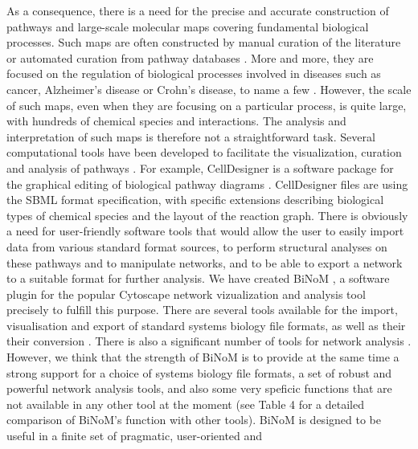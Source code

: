 \documentclass[10pt]{bmc_article}
\newenvironment{bmcformat}{\baselineskip20pt\sloppy\setboolean{publ}{false}}{\baselineskip20pt\sloppy}
\begin{document}
\begin{bmcformat}
As a consequence, there is a need for the precise and accurate construction of
pathways and large-scale molecular maps covering fundamental biological
processes. Such maps are often constructed by manual curation of the literature or
automated curation from pathway databases \cite{bauer2009pathway}. More and more, they
are focused on the regulation of biological processes involved in diseases such
as cancer, Alzheimer's disease or Crohn's disease, to name a few \cite{oda2005comprehensive, oda2006comprehensive,
calzone2008comprehensive, caron2010comprehensive}. However, the scale of such
maps, even when they are focusing on a particular process, is quite large, with
hundreds of chemical species and interactions. The analysis and interpretation of such
 maps is therefore not a straightforward task. Several computational
tools have been developed to facilitate the visualization, curation and analysis
of pathways \cite{adriaens2008public}. For example, CellDesigner is a software package
for the graphical editing of biological pathway diagrams
\cite{funahashi2003celldesigner}. CellDesigner files are using the SBML format specification, with specific extensions describing 
biological types of chemical species and the layout of the reaction graph.  There is obviously
a need for user-friendly software tools that would allow the user to easily
import data from various standard format sources, to perform structural analyses on these pathways
and to manipulate networks, and to be able to export a network to a suitable
format for further analysis. We have created
BiNoM \cite{zinovyev2008binom}, a software plugin for the popular Cytoscape
network vizualization and analysis tool \cite{cline2007integration} precisely to fulfill this purpose.
There are several tools available for the import, visualisation and export of standard systems biology file formats, as well as their their conversion
\cite{funahashi2003celldesigner, mi2011biopax, buchel2012qualitative, ruebenacker2009integrating, konig2012cysbml}. There is also a significant number of tools for network analysis
\cite{su2010glay, bader2003automated, szalay2012moduland,
morris2011clustermaker, rivera2010nemo}. However, we think that the strength of
BiNoM is to provide at the same time a strong support for a choice of systems
biology file formats, a set of robust and powerful network analysis tools, and
also some very speficic functions that are not available in any other tool at
the moment (see Table 4 for a detailed comparison of BiNoM's function with other
tools).
BiNoM is designed to be useful in a finite set of pragmatic, user-oriented and

\end{bmcformat}
\end{document}
